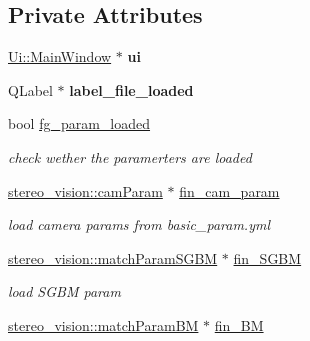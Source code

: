 \subsection*{Private Attributes}
\begin{DoxyCompactItemize}
\item 
\hypertarget{class_main_window_a35466a70ed47252a0191168126a352a5}{}\hyperlink{class_ui_1_1_main_window}{Ui\+::\+Main\+Window} $\ast$ {\bfseries ui}\label{class_main_window_a35466a70ed47252a0191168126a352a5}

\item 
\hypertarget{class_main_window_a1e59edde139fb1ef98970a3eaa941798}{}Q\+Label $\ast$ {\bfseries label\+\_\+file\+\_\+loaded}\label{class_main_window_a1e59edde139fb1ef98970a3eaa941798}

\item 
\hypertarget{class_main_window_aa32aaafb8f786e050b2f1a63d767c2b4}{}bool \hyperlink{class_main_window_aa32aaafb8f786e050b2f1a63d767c2b4}{fg\+\_\+param\+\_\+loaded}\label{class_main_window_aa32aaafb8f786e050b2f1a63d767c2b4}

\begin{DoxyCompactList}\small\item\em check wether the paramerters are loaded \end{DoxyCompactList}\item 
\hypertarget{class_main_window_af5d69a604ce89f0c07d61fdd0e722a9f}{}\hyperlink{structstereo__vision_1_1cam_param}{stereo\+\_\+vision\+::cam\+Param} $\ast$ \hyperlink{class_main_window_af5d69a604ce89f0c07d61fdd0e722a9f}{fin\+\_\+cam\+\_\+param}\label{class_main_window_af5d69a604ce89f0c07d61fdd0e722a9f}

\begin{DoxyCompactList}\small\item\em load camera params from basic\+\_\+param.\+yml \end{DoxyCompactList}\item 
\hypertarget{class_main_window_a76bb18e37b30f50bc13b2b98240d1af8}{}\hyperlink{structstereo__vision_1_1match_param_s_g_b_m}{stereo\+\_\+vision\+::match\+Param\+S\+G\+B\+M} $\ast$ \hyperlink{class_main_window_a76bb18e37b30f50bc13b2b98240d1af8}{fin\+\_\+\+S\+G\+B\+M}\label{class_main_window_a76bb18e37b30f50bc13b2b98240d1af8}

\begin{DoxyCompactList}\small\item\em load S\+G\+B\+M param \end{DoxyCompactList}\item 
\hypertarget{class_main_window_afe536255cd3b0a3e11bfbaf600816697}{}\hyperlink{structstereo__vision_1_1match_param_b_m}{stereo\+\_\+vision\+::match\+Param\+B\+M} $\ast$ \hyperlink{class_main_window_afe536255cd3b0a3e11bfbaf600816697}{fin\+\_\+\+B\+M}\label{class_main_window_afe536255cd3b0a3e11bfbaf600816697}


\end{DoxyCompactItemize}
